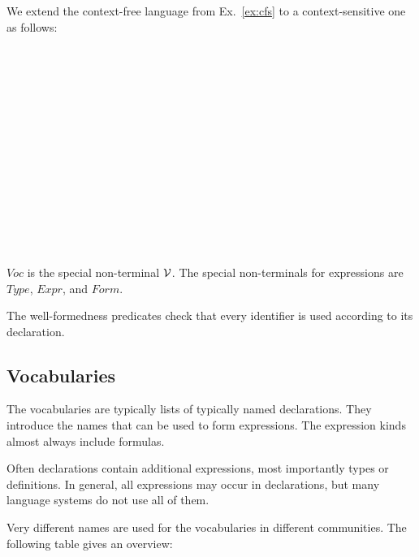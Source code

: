 \begin{example}\label{ex:css}
We extend the context-free language from Ex.~\ref{ex:cfs} to a context-sensitive one as follows:
\begin{commgrammar}
\\
\\
\\
\\
\\
\\
\\
\\
\\
\\
\\
\\
\\
\end{commgrammar}

$Voc$ is the special non-terminal $\mathcal{V}$. The special non-terminals for expressions are $Type$, $Expr$, and $Form$.

The well-formedness predicates check that every identifier is used according to its declaration.
\end{example}

\subsection{Vocabularies}

The vocabularies are typically lists of typically named declarations.
They introduce the names that can be used to form expressions.
The expression kinds almost always include formulas.

Often declarations contain additional expressions, most importantly types or definitions.
In general, all expressions may occur in declarations, but many language systems do not use all of them.

Very different names are used for the vocabularies in different communities.
The following table gives an overview:

